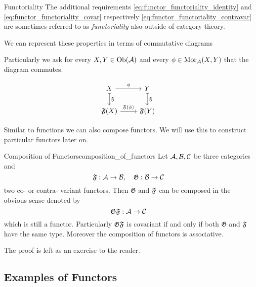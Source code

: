 \begin{myremark}{Functoriality}{}
The additional requirements \ref{eq:functor_functoriality_identity} and \ref{eq:functor_functoriality_covar} respectively \ref{eq:functor_functoriality_contravar} are sometimes referred to as \emph{functoriality} also outside of category theory.

We can represent these properties in terms of commutative diagrams

\todo

Particularly we ask for every $X,Y \in \mathrm {Ob}(\mathcal{A})$ and every $\phi \in \mathrm {Mor}_{\mathcal{A}}(X,Y)$ that the diagram commutes.

\begin{equation*}
\begin{tikzcd}
X \rar["\phi"] \dar[maps to, "\Ff"] & Y \dar[maps to, "\Ff"] \\
\Ff(X) \rar["\Ff(\phi)"]              & \Ff(Y)   
\end{tikzcd}       
\end{equation*}

\end{myremark}
Similar to functions we can also compose functors. We will use this to construct particular functors later on.
\begin{defprop}{Composition of Functors}{composition_of_functors}
Let $\mathcal{A}, \mathcal{B}, \mathcal{C}$ be three categories and
$$
\mathfrak{F}: \mathcal{A} \to \mathcal{B}, \quad \mathfrak{G}: \mathcal{B} \to \mathcal{C}
$$
two co- or contra- variant functors. Then $\mathfrak{G}$ and $\mathfrak{F}$ can be composed in the obvious sense denoted by
$$\mathfrak{G} \mathfrak{F}: \mathcal{A} \to \mathcal{C}$$
which is still a functor. Particularly $\mathfrak{G} \mathfrak{F}$ is covariant if and only if both $\mathfrak{G}$ and $\mathfrak{F}$ have the same type. Moreover the composition of functors is associative.
\end{defprop}
The proof is left as an exercise to the reader.

\subsection{Examples of Functors}

